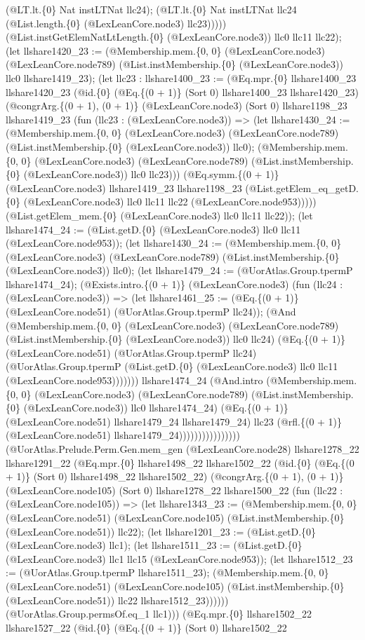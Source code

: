 \documentclass[11pt]{article}
\begin{document}
(@LT.lt.\{0\} Nat instLTNat llc24); (@LT.lt.\{0\} Nat instLTNat llc24 (@List.length.\{0\} (@LexLeanCore.node3) llc23))))) (@List.instGetElemNatLtLength.\{0\} (@LexLeanCore.node3)) llc0 llc11 llc22); (let llshare1420\_23 := (@Membership.mem.\{0, 0\} (@LexLeanCore.node3) (@LexLeanCore.node789) (@List.instMembership.\{0\} (@LexLeanCore.node3)) llc0 llshare1419\_23); (let llc23 : llshare1400\_23 := (@Eq.mpr.\{0\} llshare1400\_23 llshare1420\_23 (@id.\{0\} (@Eq.\{(0 + 1)\} (Sort 0) llshare1400\_23 llshare1420\_23) (@congrArg.\{(0 + 1), (0 + 1)\} (@LexLeanCore.node3) (Sort 0) llshare1198\_23 llshare1419\_23 (fun (llc23 : (@LexLeanCore.node3)) => (let llshare1430\_24 := (@Membership.mem.\{0, 0\} (@LexLeanCore.node3) (@LexLeanCore.node789) (@List.instMembership.\{0\} (@LexLeanCore.node3)) llc0); (@Membership.mem.\{0, 0\} (@LexLeanCore.node3) (@LexLeanCore.node789) (@List.instMembership.\{0\} (@LexLeanCore.node3)) llc0 llc23))) (@Eq.symm.\{(0 + 1)\} (@LexLeanCore.node3) llshare1419\_23 llshare1198\_23 (@List.getElem\_eq\_getD.\{0\} (@LexLeanCore.node3) llc0 llc11 llc22 (@LexLeanCore.node953))))) (@List.getElem\_mem.\{0\} (@LexLeanCore.node3) llc0 llc11 llc22)); (let llshare1474\_24 := (@List.getD.\{0\} (@LexLeanCore.node3) llc0 llc11 (@LexLeanCore.node953)); (let llshare1430\_24 := (@Membership.mem.\{0, 0\} (@LexLeanCore.node3) (@LexLeanCore.node789) (@List.instMembership.\{0\} (@LexLeanCore.node3)) llc0); (let llshare1479\_24 := (@UorAtlas.Group.tpermP llshare1474\_24); (@Exists.intro.\{(0 + 1)\} (@LexLeanCore.node3) (fun (llc24 : (@LexLeanCore.node3)) => (let llshare1461\_25 := (@Eq.\{(0 + 1)\} (@LexLeanCore.node51) (@UorAtlas.Group.tpermP llc24)); (@And (@Membership.mem.\{0, 0\} (@LexLeanCore.node3) (@LexLeanCore.node789) (@List.instMembership.\{0\} (@LexLeanCore.node3)) llc0 llc24) (@Eq.\{(0 + 1)\} (@LexLeanCore.node51) (@UorAtlas.Group.tpermP llc24) (@UorAtlas.Group.tpermP (@List.getD.\{0\} (@LexLeanCore.node3) llc0 llc11 (@LexLeanCore.node953))))))) llshare1474\_24 (@And.intro (@Membership.mem.\{0, 0\} (@LexLeanCore.node3) (@LexLeanCore.node789) (@List.instMembership.\{0\} (@LexLeanCore.node3)) llc0 llshare1474\_24) (@Eq.\{(0 + 1)\} (@LexLeanCore.node51) llshare1479\_24 llshare1479\_24) llc23 (@rfl.\{(0 + 1)\} (@LexLeanCore.node51) llshare1479\_24)))))))))))))))) (@UorAtlas.Prelude.Perm.Gen.mem\_gen (@LexLeanCore.node28) llshare1278\_22 llshare1291\_22 (@Eq.mpr.\{0\} llshare1498\_22 llshare1502\_22 (@id.\{0\} (@Eq.\{(0 + 1)\} (Sort 0) llshare1498\_22 llshare1502\_22) (@congrArg.\{(0 + 1), (0 + 1)\} (@LexLeanCore.node105) (Sort 0) llshare1278\_22 llshare1500\_22 (fun (llc22 : (@LexLeanCore.node105)) => (let llshare1343\_23 := (@Membership.mem.\{0, 0\} (@LexLeanCore.node51) (@LexLeanCore.node105) (@List.instMembership.\{0\} (@LexLeanCore.node51)) llc22); (let llshare1201\_23 := (@List.getD.\{0\} (@LexLeanCore.node3) llc1); (let llshare1511\_23 := (@List.getD.\{0\} (@LexLeanCore.node3) llc1 llc15 (@LexLeanCore.node953)); (let llshare1512\_23 := (@UorAtlas.Group.tpermP llshare1511\_23); (@Membership.mem.\{0, 0\} (@LexLeanCore.node51) (@LexLeanCore.node105) (@List.instMembership.\{0\} (@LexLeanCore.node51)) llc22 llshare1512\_23)))))) (@UorAtlas.Group.permsOf.eq\_1 llc1))) (@Eq.mpr.\{0\} llshare1502\_22 llshare1527\_22 (@id.\{0\} (@Eq.\{(0 + 1)\} (Sort 0) llshare1502\_22 
\end{document}
